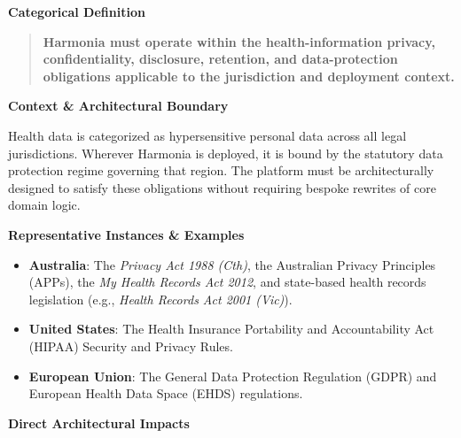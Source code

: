 \par\medskip\textbf{Categorical Definition}\par


\begin{quote}


\textbf{Harmonia must operate within the health-information privacy, confidentiality, disclosure, retention, and data-protection obligations applicable to the jurisdiction and deployment context.}



\end{quote}


\par\medskip\textbf{Context \& Architectural Boundary}\par


Health data is categorized as hypersensitive personal data across all legal jurisdictions. Wherever Harmonia is deployed, it is bound by the statutory data protection regime governing that region. The platform must be architecturally designed to satisfy these obligations without requiring bespoke rewrites of core domain logic.



\par\medskip\textbf{Representative Instances \& Examples}\par


\begin{itemize}


\item \textbf{Australia}: The \emph{Privacy Act 1988 (Cth)}, the Australian Privacy Principles (APPs), the \emph{My Health Records Act 2012}, and state-based health records legislation (e.g., \emph{Health Records Act 2001 (Vic)}).

\item \textbf{United States}: The Health Insurance Portability and Accountability Act (HIPAA) Security and Privacy Rules.

\item \textbf{European Union}: The General Data Protection Regulation (GDPR) and European Health Data Space (EHDS) regulations.

\end{itemize}


\par\medskip\textbf{Direct Architectural Impacts}\par


